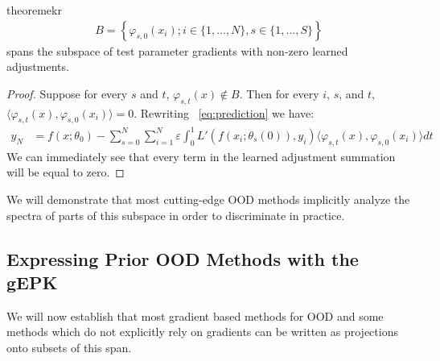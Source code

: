 \begin{restatable}{theorem}{ekr}
\label{thm:oodspan}
\begin{align}
    B = \left\{\varphi_{s, 0}(x_i); i \in \{1,...,N\}, s \in \{1,...,S\}\right\}
\end{align}
spans the subspace of test parameter gradients with non-zero learned adjustments. 
\end{restatable}
\begin{proof}
Suppose for every $s$ and $t$, $\varphi_{s, t}(x) \notin B$. Then for every $i$, $s$, and $t$, $\langle \varphi_{s,t}(x), \varphi_{s, 0}(x_i)\rangle = 0$. Rewriting ~\eqref{eq:prediction} we have:
\begin{align}
   y_N &= f(x; \theta_0) - \sum_{s=0}^N \sum_{i = 1}^{N} \varepsilon \int_0^1 L'(f(x_i; \theta_s(0)), y_i) \langle \varphi_{s, t}(x), \varphi_{s,0}(x_i) \rangle dt 
\end{align}
We can immediately see that every term in the learned adjustment summation will be equal to zero. 
\end{proof}
We will demonstrate that most cutting-edge OOD methods implicitly analyze the spectra of parts of this subspace in order to discriminate in practice. 

\subsection{Expressing Prior OOD Methods with the gEPK}

 We will now establish that most gradient based methods for OOD and some methods which do not explicitly rely on gradients can be written as projections onto subsets of this span. 

